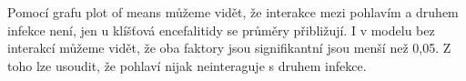 \documentclass[twoside]{article}\usepackage[]{graphicx}\usepackage[]{color}
\begin{document}
Pomocí grafu plot of means můžeme vidět, že interakce mezi pohlavím a druhem infekce není, jen u klíšťová encefalitidy se průměry přibližují. I v modelu bez interakcí můžeme vidět, že oba faktory jsou signifikantní jsou menší než 0,05. Z toho lze usoudit, že pohlaví nijak neinteraguje s druhem infekce.
\end{document}
